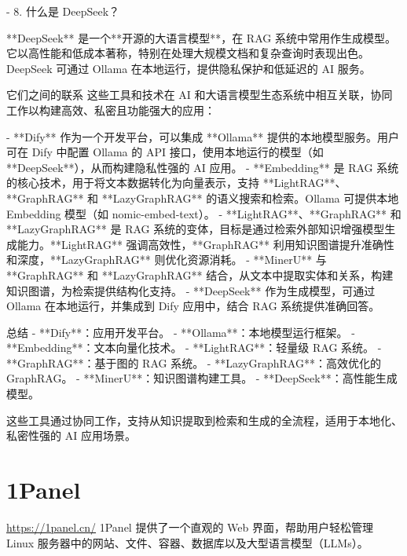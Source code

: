 - 8. 什么是 DeepSeek？

**DeepSeek** 是一个**开源的大语言模型**，在 RAG 系统中常用作生成模型。它以高性能和低成本著称，特别在处理大规模文档和复杂查询时表现出色。DeepSeek 可通过 Ollama 在本地运行，提供隐私保护和低延迟的 AI 服务。

 它们之间的联系
这些工具和技术在 AI 和大语言模型生态系统中相互关联，协同工作以构建高效、私密且功能强大的应用：

- **Dify** 作为一个开发平台，可以集成 **Ollama** 提供的本地模型服务。用户可在 Dify 中配置 Ollama 的 API 接口，使用本地运行的模型（如 **DeepSeek**），从而构建隐私性强的 AI 应用。
- **Embedding** 是 RAG 系统的核心技术，用于将文本数据转化为向量表示，支持 **LightRAG**、**GraphRAG** 和 **LazyGraphRAG** 的语义搜索和检索。Ollama 可提供本地 Embedding 模型（如 nomic-embed-text）。
- **LightRAG**、**GraphRAG** 和 **LazyGraphRAG** 是 RAG 系统的变体，目标是通过检索外部知识增强模型生成能力。**LightRAG** 强调高效性，**GraphRAG** 利用知识图谱提升准确性和深度，**LazyGraphRAG** 则优化资源消耗。
- **MinerU** 与 **GraphRAG** 和 **LazyGraphRAG** 结合，从文本中提取实体和关系，构建知识图谱，为检索提供结构化支持。
- **DeepSeek** 作为生成模型，可通过 Ollama 在本地运行，并集成到 Dify 应用中，结合 RAG 系统提供准确回答。

总结
- **Dify**：应用开发平台。
- **Ollama**：本地模型运行框架。
- **Embedding**：文本向量化技术。
- **LightRAG**：轻量级 RAG 系统。
- **GraphRAG**：基于图的 RAG 系统。
- **LazyGraphRAG**：高效优化的 GraphRAG。
- **MinerU**：知识图谱构建工具。
- **DeepSeek**：高性能生成模型。

这些工具通过协同工作，支持从知识提取到检索和生成的全流程，适用于本地化、私密性强的 AI 应用场景。



\section{1Panel}
\url{https://1panel.cn/}
1Panel 提供了一个直观的 Web 界面，帮助用户轻松管理 Linux 服务器中的网站、文件、容器、数据库以及大型语言模型（LLMs）。




